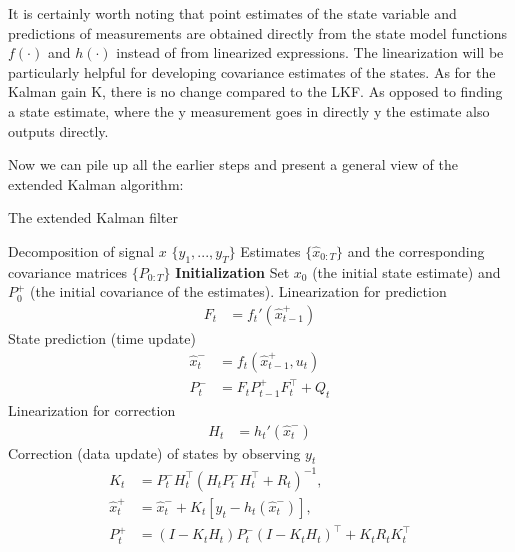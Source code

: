 It is certainly worth noting that point estimates of the state variable and predictions of measurements are obtained directly from the state model functions \(f(\cdot)\) and \(h(\cdot)\) instead of from linearized expressions. The linearization will be particularly helpful for developing covariance estimates of the states. As for the Kalman gain K, there is no change compared to the LKF. As opposed to finding a state estimate, where the y measurement goes in directly y the estimate also outputs directly.

Now we can pile up all the earlier steps and present a general view of the extended Kalman algorithm:

\begin{algorithm}
    \caption{The extended Kalman filter}
  \begin{algorithmic}[1]
    \REQUIRE Decomposition of signal $x$
    \INPUT \(\{y_1, . . . , y_T\}\)
    \OUTPUT Estimates \(\{\hat{x}_{0:T}\}\) and the corresponding covariance matrices \(\{P_{0:T}\}\)
    \STATE \textbf{Initialization} Set $x_0$ (the initial state estimate) and $P_0^+$ (the initial covariance of the estimates).
      \STATE Linearization for prediction
        $$
        \begin{aligned}
            F_t &= f_t'(\hat{x}_{t-1}^+)
        \end{aligned}
        $$
      \STATE State prediction (time update)
        $$
        \begin{aligned}
            \hat{x}_t^{-} &= f_t(\hat{x}_{t-1}^+, u_t)\\
            P_t^{-} &= F_t P_{t-1}^{+} F_t^\intercal + Q_t
        \end{aligned}
        $$
      \STATE Linearization for correction
        $$
        \begin{aligned}
            H_t &= h_t'(\hat{x}_{t}^-)
        \end{aligned}
        $$
      \STATE Correction (data update) of states by observing $y_t$
        $$
        \begin{aligned}
            K_t &= P_{t}^- H_t^\intercal (H_t P_{t}^{-} H_t^\intercal + R_t)^{-1},\\
            \hat{x}_t^+ &= \hat{x}_{t}^{-} + K_t\left[y_t - h_t\left(\hat{x}_{t}^{-}\right)\right], \\
            P_t^{+} &= (I - K_t H_t) P_{t}^{-} (I - K_t H_t)^\intercal + K_t R_t K_t^\intercal \\
        \end{aligned}
        $$
    \ENDFOR
  \end{algorithmic}
  \label{alg:ekf}
\end{algorithm}

